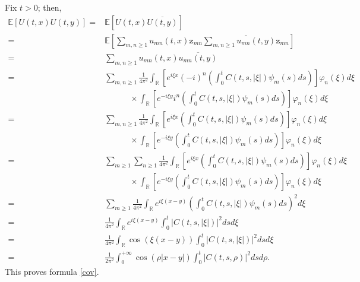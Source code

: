\documentclass{article}
\begin{document}
Fix $t>0$; then,
\begin{align*}
\mathbb{E}[U(t,x)U(t,y)]=&\mathbb{E}[U(t,x)\overline{U(t,y)}]\\
=&\mathbb{E}\left[\sum_{m,n\geq 1}u_{mn}(t,x)\mathtt{z}_{mn}\overline{\sum_{m,n\geq 1}u_{mn}(t,y)\mathtt{z}_{mn}}\right]\\
=&\sum_{m,n\geq 1}u_{mn}(t,x)\overline{u_{mn}(t,y)}\\
=&\sum_{m,n\geq 1}\frac{1}{4\pi^2}\int_{\mathbb{R}}\left[e^{i\xi x}(-i)^n\left(\int_0^tC(t,s,|\xi|)\psi_m(s)ds\right)\right]\varphi_n(\xi)d\xi\\
&\quad\quad\quad\times\int_{\mathbb{R}}\left[e^{-i\xi y}i^n\left(\int_0^tC(t,s,|\xi|)\psi_m(s)ds\right)\right]\varphi_n(\xi)d\xi\\
=&\sum_{m,n\geq 1}\frac{1}{4\pi^2}\int_{\mathbb{R}}\left[e^{i\xi x}\left(\int_0^tC(t,s,|\xi|)\psi_m(s)ds\right)\right]\varphi_n(\xi)d\xi\\
&\quad\quad\quad\times\int_{\mathbb{R}}\left[e^{-i\xi y}\left(\int_0^tC(t,s,|\xi|)\psi_m(s)ds\right)\right]\varphi_n(\xi)d\xi\\
=&\sum_{m\geq 1}\sum_{n\geq 1}\frac{1}{4\pi^2}\int_{\mathbb{R}}\left[e^{i\xi x}\left(\int_0^tC(t,s,|\xi|)\psi_m(s)ds\right)\right]\varphi_n(\xi)d\xi\\
&\quad\quad\quad\times\int_{\mathbb{R}}\left[e^{-i\xi y}\left(\int_0^tC(t,s,|\xi|)\psi_m(s)ds\right)\right]\varphi_n(\xi)d\xi\\
=&\sum_{m\geq 1}\frac{1}{4\pi^2}\int_{\mathbb{R}}e^{i\xi (x-y)}\left(\int_0^tC(t,s,|\xi|)\psi_m(s)ds\right)^2d\xi\\
=&\frac{1}{4\pi^2}\int_{\mathbb{R}}e^{i\xi (x-y)}\int_0^t|C(t,s,|\xi|)|^2dsd\xi\\
=&\frac{1}{4\pi^2}\int_{\mathbb{R}}\cos(\xi (x-y))\int_0^t|C(t,s,|\xi|)|^2dsd\xi\\
=&\frac{1}{2\pi^2}\int_0^{+\infty}\cos(\rho |x-y|)\int_0^t|C(t,s,\rho)|^2dsd\rho.
\end{align*}
This proves formula \eqref{cov}. 

\end{document}
